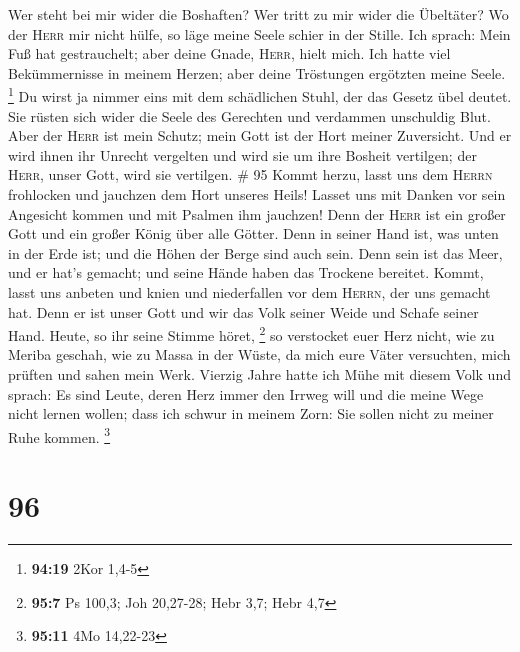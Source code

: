 Wer steht bei mir wider die Boshaften? Wer tritt zu mir wider die
Übeltäter?  Wo der \textsc{Herr} mir nicht hülfe, so läge
meine Seele schier in der Stille.  Ich sprach: Mein Fuß
hat gestrauchelt; aber deine Gnade, \textsc{Herr}, hielt mich.
 Ich hatte viel Bekümmernisse in meinem Herzen; aber
deine Tröstungen ergötzten meine Seele. \footnote{\textbf{94:19} 2Kor
  1,4-5}  Du wirst ja nimmer eins mit dem schädlichen
Stuhl, der das Gesetz übel deutet.  Sie rüsten sich wider
die Seele des Gerechten und verdammen unschuldig Blut. 
Aber der \textsc{Herr} ist mein Schutz; mein Gott ist der Hort meiner
Zuversicht.  Und er wird ihnen ihr Unrecht vergelten und
wird sie um ihre Bosheit vertilgen; der \textsc{Herr}, unser Gott, wird
sie vertilgen. \# 95  Kommt herzu, lasst uns dem
\textsc{Herrn} frohlocken und jauchzen dem Hort unseres Heils!
 Lasset uns mit Danken vor sein Angesicht kommen und mit
Psalmen ihm jauchzen!  Denn der \textsc{Herr} ist ein
großer Gott und ein großer König über alle Götter.  Denn
in seiner Hand ist, was unten in der Erde ist; und die Höhen der Berge
sind auch sein.  Denn sein ist das Meer, und er hat's
gemacht; und seine Hände haben das Trockene bereitet. 
Kommt, lasst uns anbeten und knien und niederfallen vor dem
\textsc{Herrn}, der uns gemacht hat.  Denn er ist unser
Gott und wir das Volk seiner Weide und Schafe seiner Hand. Heute, so ihr
seine Stimme höret, \footnote{\textbf{95:7} Ps 100,3; Joh 20,27-28; Hebr
  3,7; Hebr 4,7}  so verstocket euer Herz nicht, wie zu
Meriba geschah, wie zu Massa in der Wüste,  da mich eure
Väter versuchten, mich prüften und sahen mein Werk. 
Vierzig Jahre hatte ich Mühe mit diesem Volk und sprach: Es sind Leute,
deren Herz immer den Irrweg will und die meine Wege nicht lernen wollen;
 dass ich schwur in meinem Zorn: Sie sollen nicht zu
meiner Ruhe kommen. \footnote{\textbf{95:11} 4Mo 14,22-23}

\hypertarget{section-31}{%
\section{96}\label{section-31}}

